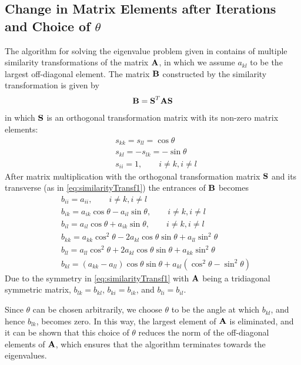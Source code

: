 \subsection{Change in Matrix Elements after Iterations and Choice of $\theta$}
\label{subsec:MatrixElementChange}
The algorithm for solving the eigenvalue problem given in  contains of multiple similarity transformations of the matrix $\mbox{\textbf{A}}$, in which we assume $a_{kl}$ to be the largest off-diagonal element.
The matrix $\mbox{\textbf{B}}$ constructed by the similarity transformation is given by
\begin{align}
	\mbox{\textbf{B}} = \mbox{\textbf{S}}^T \mbox{\textbf{A}} \mbox{\textbf{S}}
	\label{eq:similarityTransf1}
\end{align}
in which $\mbox{\textbf{S}}$ is an orthogonal transformation matrix with its non-zero matrix elements:
\begin{align*}
	& s_{kk} = s_{ll} = \cos \theta
	\\
	& s_{kl} = -s_{lk} = -\sin \theta 
	\\
	& s_{ii} = 1 , \qquad i \neq k , i \neq l
\end{align*}
After matrix multiplication with the orthogonal transformation matrix $\mbox{\textbf{S}}$ and its transverse (as in \eqref{eq:similarityTransf1}) the entrances of $\mbox{\textbf{B}}$ becomes
\begin{align*}
	& b_{ii} = a_{ii}, \qquad i \neq k, i \neq l
	\\
	& b_{ik} = a_{ik} \cos \theta - a_{il} \sin \theta , \qquad i \neq k , i \neq l
	\\
	& b_{il} = a_{il} \cos \theta + a_{ik} \sin \theta , \qquad i \neq k , i \neq l
	\\
	& b_{kk} = a_{kk} \cos ^2 \theta - 2 a_{kl} \cos \theta \sin \theta + a_{ll} \sin ^2 \theta
	\\
	 &b_{ll} = a_{ll} \cos ^2 \theta + 2 a_{kl} \cos \theta \sin \theta + a_{kk} \sin ^2 \theta
	\\
	& b_{kl} = (a_{kk} - a_{ll} ) \cos \theta \sin \theta + a_{kl} (\cos ^2 \theta - \sin ^2 \theta )
\end{align*}
Due to the symmetry in \eqref{eq:similarityTransf1} with $\mbox{\textbf{A}}$ being a tridiagonal symmetric matrix, $b_{lk} = b_{kl}$, $b_{ki} = b_{ik}$, and $b_{li} = b_{il}$.


Since $\theta$ can be chosen arbitrarily, we choose $\theta$ to be the angle at which $b_{kl}$, and hence $b_{lk}$, becomes zero.
In this way, the largest element of $\mbox{\textbf{A}}$ is eliminated, and it can be shown that this choice of $\theta$ reduces the norm of the off-diagonal elements of $\mbox{\textbf{A}}$, which ensures that the algorithm terminates towards the eigenvalues.

